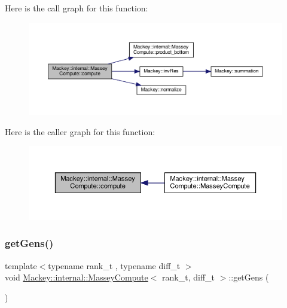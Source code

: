 Here is the call graph for this function\+:\nopagebreak
\begin{figure}[H]
\begin{center}
\leavevmode
\includegraphics[width=350pt]{structMackey_1_1internal_1_1MasseyCompute_a0dc26be60def312ab591b72b1e24144f_cgraph}
\end{center}
\end{figure}
Here is the caller graph for this function\+:\nopagebreak
\begin{figure}[H]
\begin{center}
\leavevmode
\includegraphics[width=350pt]{structMackey_1_1internal_1_1MasseyCompute_a0dc26be60def312ab591b72b1e24144f_icgraph}
\end{center}
\end{figure}
\mbox{\label{structMackey_1_1internal_1_1MasseyCompute_ae7e9d0ea52c8e8373374535d41221dcb}} 
\subsubsection{\texorpdfstring{get\+Gens()}{getGens()}}
{\footnotesize\ttfamily template$<$typename rank\+\_\+t , typename diff\+\_\+t $>$ \\
void \hyperlink{structMackey_1_1internal_1_1MasseyCompute}{Mackey\+::internal\+::\+Massey\+Compute}$<$ rank\+\_\+t, diff\+\_\+t $>$\+::get\+Gens (\begin{DoxyParamCaption}{ }\end{DoxyParamCaption})}

